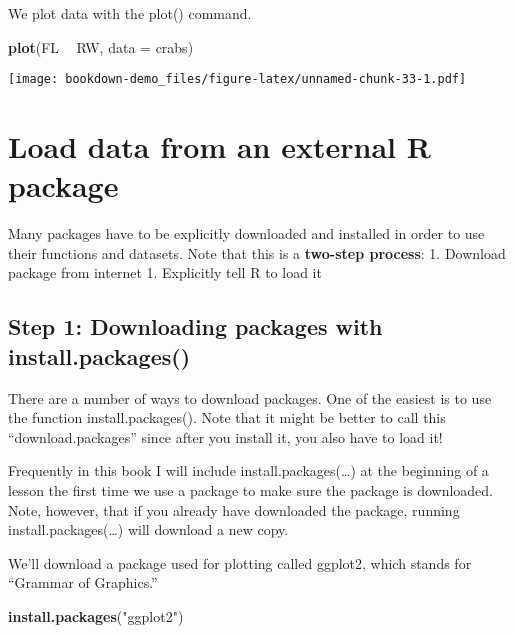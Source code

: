 \documentclass[]{book}
\newenvironment{Shaded}{\begin{snugshade}}{\end{snugshade}}
\newcommand{\KeywordTok}[1]{\textcolor[rgb]{0.13,0.29,0.53}{\textbf{#1}}}
\newcommand{\DataTypeTok}[1]{\textcolor[rgb]{0.13,0.29,0.53}{#1}}
\newcommand{\StringTok}[1]{\textcolor[rgb]{0.31,0.60,0.02}{#1}}
\newcommand{\OperatorTok}[1]{\textcolor[rgb]{0.81,0.36,0.00}{\textbf{#1}}}
\newcommand{\NormalTok}[1]{#1}
\theoremstyle{definition}
\theoremstyle{definition}
\theoremstyle{definition}
\theoremstyle{remark}
\begin{document}
We plot data with the plot() command.

\begin{Shaded}
\begin{Highlighting}[]
\KeywordTok{plot}\NormalTok{(FL }\OperatorTok{~}\StringTok{ }\NormalTok{RW, }\DataTypeTok{data =}\NormalTok{ crabs)}
\end{Highlighting}
\end{Shaded}

\texttt{[image: bookdown-demo\_files/figure-latex/unnamed-chunk-33-1.pdf]}

\section{Load data from an external R
package}\label{load-data-from-an-external-r-package}

Many packages have to be explicitly downloaded and installed in order to
use their functions and datasets. Note that this is a \textbf{two-step
process}: 1. Download package from internet 1. Explicitly tell R to load
it

\subsection{\texorpdfstring{\protect\hyperlink{section-3}{} Step 1:
Downloading packages with
install.packages()}{ Step 1: Downloading packages with install.packages()}}\label{step-1-downloading-packages-with-install.packages}

There are a number of ways to download packages. One of the easiest is
to use the function install.packages(). Note that it might be better to
call this ``download.packages'' since after you install it, you also
have to load it!

Frequently in this book I will include install.packages(\ldots{}) at the
beginning of a lesson the first time we use a package to make sure the
package is downloaded. Note, however, that if you already have
downloaded the package, running install.packages(\ldots{}) will download
a new copy.

We'll download a package used for plotting called ggplot2, which stands
for ``Grammar of Graphics.''

\begin{Shaded}
\begin{Highlighting}[]
\KeywordTok{install.packages}\NormalTok{(}\StringTok{"ggplot2"}\NormalTok{)}
\end{Highlighting}
\end{Shaded}
\end{document}
